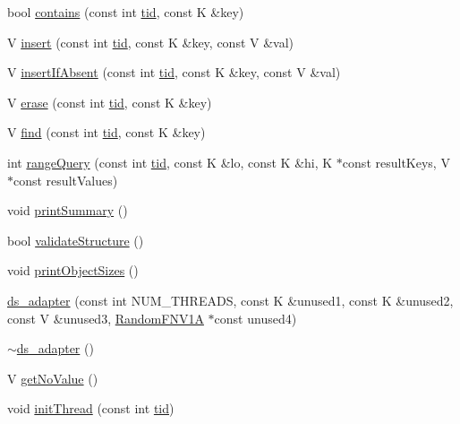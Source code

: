 \begin{DoxyCompactItemize}
\item 
bool \hyperlink{classds__adapter_aecf1899dbe9fae93c72ee2b5549cf6eb}{contains} (const int \hyperlink{microbench_2main_8cpp_a9ca9869868fe7e7a38a921cc7de4103f}{tid}, const K \&key)
\item 
V \hyperlink{classds__adapter_a6c0fc676d77e30e14946baf325174739}{insert} (const int \hyperlink{microbench_2main_8cpp_a9ca9869868fe7e7a38a921cc7de4103f}{tid}, const K \&key, const V \&val)
\item 
V \hyperlink{classds__adapter_ae9cb29ad0c0338c0e1d12ef97e008135}{insert\+If\+Absent} (const int \hyperlink{microbench_2main_8cpp_a9ca9869868fe7e7a38a921cc7de4103f}{tid}, const K \&key, const V \&val)
\item 
V \hyperlink{classds__adapter_a1bf459e8449df93cc738a644aeffdcfb}{erase} (const int \hyperlink{microbench_2main_8cpp_a9ca9869868fe7e7a38a921cc7de4103f}{tid}, const K \&key)
\item 
V \hyperlink{classds__adapter_a0109b0d011810f687c9e9273eb1d1bc8}{find} (const int \hyperlink{microbench_2main_8cpp_a9ca9869868fe7e7a38a921cc7de4103f}{tid}, const K \&key)
\item 
int \hyperlink{classds__adapter_a23a9c8db5425e98a93d647df1c6c23dd}{range\+Query} (const int \hyperlink{microbench_2main_8cpp_a9ca9869868fe7e7a38a921cc7de4103f}{tid}, const K \&lo, const K \&hi, K $\ast$const result\+Keys, V $\ast$const result\+Values)
\item 
void \hyperlink{classds__adapter_aac97293215557665d2ef1e1a0d06fcfd}{print\+Summary} ()
\item 
bool \hyperlink{classds__adapter_ae50fe8a8683c0278cdd4c45e1405860d}{validate\+Structure} ()
\item 
void \hyperlink{classds__adapter_a33b13b7059a8c0345fb59a324dc3a691}{print\+Object\+Sizes} ()
\item 
\hyperlink{classds__adapter_ab37964787a66459a325cf75ac91da4e8}{ds\+\_\+adapter} (const int N\+U\+M\+\_\+\+T\+H\+R\+E\+A\+DS, const K \&unused1, const K \&unused2, const V \&unused3, \hyperlink{classRandomFNV1A}{Random\+F\+N\+V1A} $\ast$const unused4)
\item 
\hyperlink{classds__adapter_a366f46dd39d59f2d4a147589f5fd98e3}{$\sim$ds\+\_\+adapter} ()
\item 
V \hyperlink{classds__adapter_a9e1e4aec136b351d1a6820d70484a6c5}{get\+No\+Value} ()
\item 
void \hyperlink{classds__adapter_a3733f6a6b57312b1b5e4fb5181d82a0b}{init\+Thread} (const int \hyperlink{microbench_2main_8cpp_a9ca9869868fe7e7a38a921cc7de4103f}{tid})

\end{DoxyCompactItemize}
